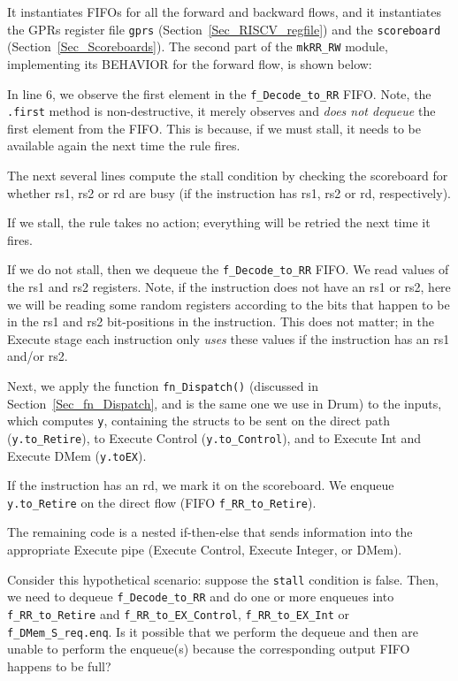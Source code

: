 

It instantiates FIFOs for all the forward and backward flows, and it
instantiates the GPRs register file \verb|gprs|
(Section~\ref{Sec_RISCV_regfile}) and the \verb|scoreboard|
(Section~\ref{Sec_Scoreboards}).  The second part of the
\verb|mkRR_RW| module, implementing its BEHAVIOR for the forward flow,
is shown below:



In line 6, we observe the first element in the \verb|f_Decode_to_RR|
FIFO.  Note, the \verb|.first| method is non-destructive, {\ie} it
merely observes and \emph{does not dequeue} the first element from the
FIFO.  This is because, if we must stall, it needs to be available
again the next time the rule fires.

The next several lines compute the stall condition by checking the
scoreboard for whether rs1, rs2 or rd are busy (if the instruction has
rs1, rs2 or rd, respectively).

If we stall, the rule takes no action; everything will be retried the
next time it fires.

If we do not stall, then we dequeue the \verb|f_Decode_to_RR| FIFO.
We read values of the rs1 and rs2 registers.  Note, if the instruction
does not have an rs1 or rs2, here we will be reading some random
registers according to the bits that happen to be in the rs1 and rs2
bit-positions in the instruction.  This does not matter; in the
Execute stage each instruction only \emph{uses} these values if the
instruction has an rs1 and/or rs2.

Next, we apply the function \verb|fn_Dispatch()| (discussed in
Section~\ref{Sec_fn_Dispatch}, and is the same one we use in Drum) to
the inputs, which computes \verb|y|, containing the structs to be sent
on the direct path (\verb|y.to_Retire|), to Execute Control
(\verb|y.to_Control|), and to Execute Int and Execute DMem
(\verb|y.toEX|).

If the instruction has an rd, we mark it on the scoreboard.  We
enqueue \verb|y.to_Retire| on the direct flow (FIFO
\verb|f_RR_to_Retire|).

The remaining code is a nested if-then-else that sends information
into the appropriate Execute pipe (Execute Control, Execute Integer,
or DMem).

\hdivider

\Exercise

Consider this hypothetical scenario: suppose the \verb|stall|
condition is false.  Then, we need to dequeue \verb|f_Decode_to_RR|
and do one or more enqueues into \verb|f_RR_to_Retire| and
\verb|f_RR_to_EX_Control|, \verb|f_RR_to_EX_Int| or
\verb|f_DMem_S_req.enq|.  Is it possible that we perform the dequeue
and then are unable to perform the enqueue(s) because the
corresponding output FIFO happens to be full?

